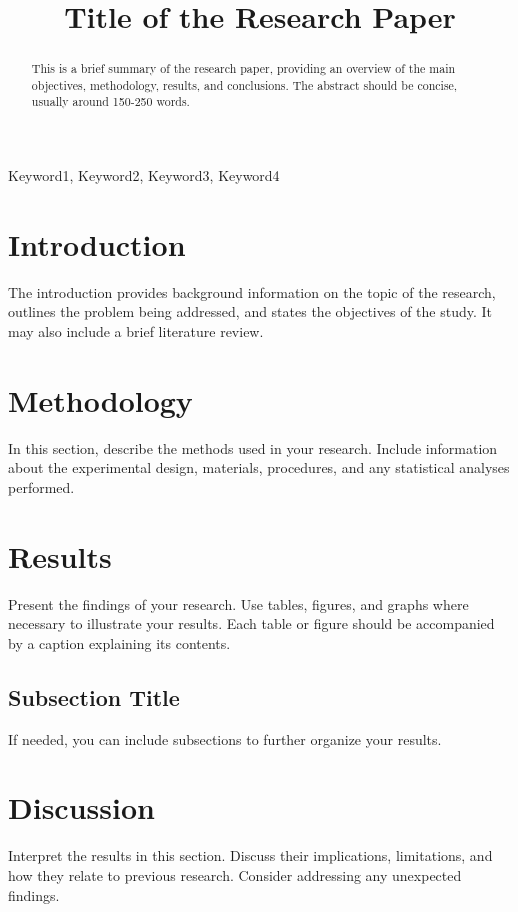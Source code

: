 \documentclass[conference]{IEEEtran}
\title{Title of the Research Paper}
\author{\IEEEauthorblockN{Your Name}
\IEEEauthorblockA{Your Institution\\
Your Email}
}
\begin{document}
\maketitle

\begin{abstract}
    This is a brief summary of the research paper, providing an overview of the main objectives, methodology, results, and conclusions. The abstract should be concise, usually around 150-250 words.
\end{abstract}

\begin{IEEEkeywords}
    Keyword1, Keyword2, Keyword3, Keyword4
\end{IEEEkeywords}

\section{Introduction}
The introduction provides background information on the topic of the research, outlines the problem being addressed, and states the objectives of the study. It may also include a brief literature review.

\section{Methodology}
In this section, describe the methods used in your research. Include information about the experimental design, materials, procedures, and any statistical analyses performed.

\section{Results}
Present the findings of your research. Use tables, figures, and graphs where necessary to illustrate your results. Each table or figure should be accompanied by a caption explaining its contents.

\subsection{Subsection Title}
If needed, you can include subsections to further organize your results.

\section{Discussion}
Interpret the results in this section. Discuss their implications, limitations, and how they relate to previous research. Consider addressing any unexpected findings.
\end{document}
